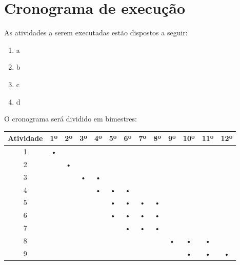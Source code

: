 \section{Cronograma de execução}
As atividades a serem executadas estão dispostos a seguir:
\begin{enumerate}
    \item a
    \item b
    \item c
    \item d
\end{enumerate}

O cronograma será dividido em bimestres:

\begin{table}[H]
    \centering
    \begin{tabular}{|c|c|c|c|c|c|c|c|c|c|c|c|c|}
    \hline
        Atividade & 1º & 2º & 3º & 4º & 5º & 6º & 7º & 8º & 9º &10º & 11º & 12º\\
    \hline
        1 & • &  &  &  &  &  &  &  &  &  &  & \\
    \hline
        2 &  & • &  &  &  &  &  &  &  &  &  &  \\
    \hline
        3 &  &  & • & • &  &  &  &  &  &  &  &  \\
    \hline
        4 &  &  &  & • & • & • &  &  &  &  &  &  \\
    \hline
        5 &  &  &  &  & • & • & • & • &  &  &  &  \\
    \hline
        6 &  &  &  &  & • & • & • & • &  &  &  &  \\
    \hline
        7 &  &  &  &  &  & • & • & • &  &  &  &  \\
    \hline
        8 &  &  &  &  &  &  &  &  & • & • & • &  \\
    \hline
        9 &  &  &  &  &  &  &  &  &  & • & • & • \\
    \hline
    \end{tabular}
\end{table}